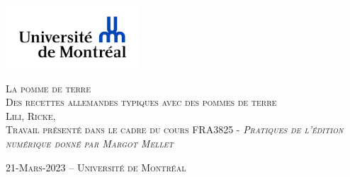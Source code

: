 \documentclass[12pt,french,letterpaper]{article}
\subtitle{Des recettes allemandes typiques avec des pommes de terre}
\author{Lili    Ricke    Université de Montréal }
\date{}
\begin{document}

\begin{titlepage}%
\begin{center}
    \enlargethispage{2cm}
    
\includegraphics[width = 50mm]{logo} %

\vspace*{3cm}
\scshape\Huge La pomme de terre\\
\normalfont\Large Des recettes allemandes typiques avec des pommes de
terre\\
\large \vspace*{3cm}
Lili,  Ricke,  
\\
\normalsize\vspace*{1cm}Travail présenté dans le cadre du cours FRA3825 - \em Pratiques
de l'édition numérique
 \normalfont donné par Margot Mellet 

\vspace*{3cm}
\end{center}

\vspace*{\fill}
\begin{flushright}
\end{flushright}

\begin{center}
\scshape\normalsize\vspace*{1cm} 21-Mars-2023 --      Université de
Montréal 
\\
\end{center}
\end{titlepage}




\newpage 
\end{document}
